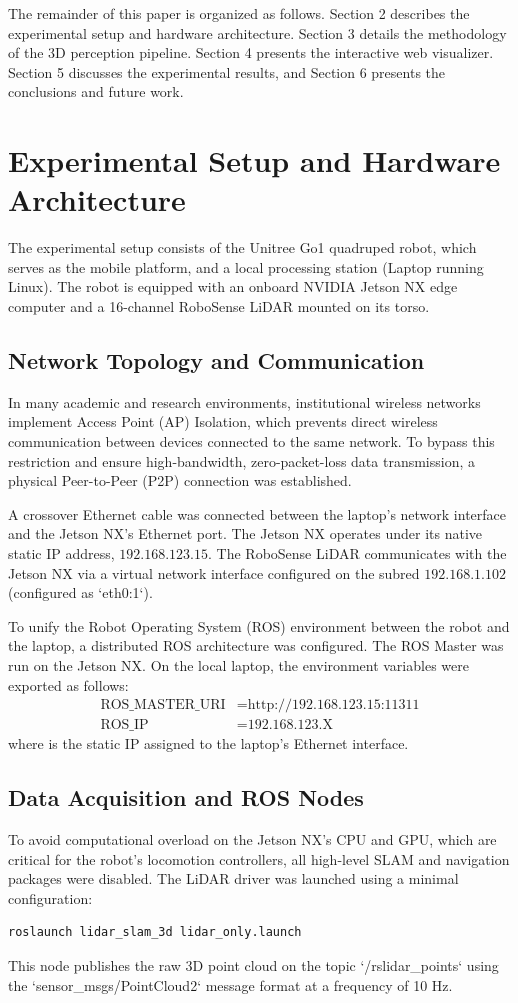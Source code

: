 \documentclass[a4paper,twocolumn]{article}
\begin{document}
The remainder of this paper is organized as follows. Section 2 describes the experimental setup and hardware architecture. Section 3 details the methodology of the 3D perception pipeline. Section 4 presents the interactive web visualizer. Section 5 discusses the experimental results, and Section 6 presents the conclusions and future work.

\section{Experimental Setup and Hardware Architecture}
The experimental setup consists of the Unitree Go1 quadruped robot, which serves as the mobile platform, and a local processing station (Laptop running Linux). The robot is equipped with an onboard NVIDIA Jetson NX edge computer and a 16-channel RoboSense LiDAR mounted on its torso.

\subsection{Network Topology and Communication}
In many academic and research environments, institutional wireless networks implement Access Point (AP) Isolation, which prevents direct wireless communication between devices connected to the same network. To bypass this restriction and ensure high-bandwidth, zero-packet-loss data transmission, a physical Peer-to-Peer (P2P) connection was established.

A crossover Ethernet cable was connected between the laptop's network interface and the Jetson NX's Ethernet port. The Jetson NX operates under its native static IP address, $192.168.123.15$. The RoboSense LiDAR communicates with the Jetson NX via a virtual network interface configured on the subred $192.168.1.102$ (configured as `eth0:1`).

To unify the Robot Operating System (ROS) environment between the robot and the laptop, a distributed ROS architecture was configured. The ROS Master was run on the Jetson NX. On the local laptop, the environment variables were exported as follows:
\begin{align*}
\text{ROS\_MASTER\_URI} &= \text{http://192.168.123.15:11311} \\
\text{ROS\_IP} &= \text{192.168.123.X}
\end{align*}
where  is the static IP assigned to the laptop's Ethernet interface.

\subsection{Data Acquisition and ROS Nodes}
To avoid computational overload on the Jetson NX's CPU and GPU, which are critical for the robot's locomotion controllers, all high-level SLAM and navigation packages were disabled. The LiDAR driver was launched using a minimal configuration:
\begin{verbatim}
roslaunch lidar_slam_3d lidar_only.launch
\end{verbatim}
This node publishes the raw 3D point cloud on the topic `/rslidar_points` using the `sensor_msgs/PointCloud2` message format at a frequency of 10 Hz.
\end{document}
